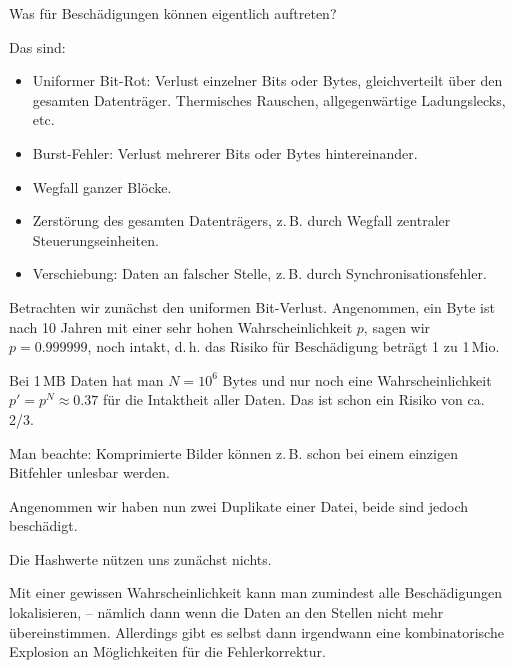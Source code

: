 \documentclass{beamer}
\begin{document}
\begin{frame}[t]
\vspace{1em}
Was für Beschädigungen können eigentlich auftreten?\pause

\vspace{1em}
Das sind:
\begin{itemize}
\item Uniformer Bit-Rot: Verlust einzelner Bits oder Bytes,
  gleichverteilt über den gesamten Datenträger. Thermisches Rauschen,
  allgegenwärtige Ladungslecks, etc.
\item Burst-Fehler: Verlust mehrerer Bits oder Bytes hintereinander.
\item Wegfall ganzer Blöcke.
\item Zerstörung des gesamten Datenträgers, z.\,B. durch Wegfall
  zentraler Steuerungseinheiten.
\item Verschiebung: Daten an falscher Stelle, z.\,B. durch
  Synchronisationsfehler.
\end{itemize}
\end{frame}

\begin{frame}[t]
\vspace{2em}
Betrachten wir zunächst den uniformen Bit-Verlust. Angenommen, ein Byte
ist nach 10 Jahren mit einer sehr hohen Wahrscheinlichkeit $p$, sagen
wir $p=0.999999$, noch intakt, d.\,h. das Risiko für Beschädigung beträgt
1 zu 1\,Mio.\pause

\vspace{1em}
Bei 1\,MB Daten hat man $N=10^6$ Bytes und nur noch eine
Wahrscheinlichkeit $p' = p^N \approx 0.37$ für die Intaktheit aller Daten.
Das ist schon ein Risiko von ca. 2/3.\pause

\vspace{1em}
Man beachte: Komprimierte Bilder können z.\,B. schon bei einem einzigen
Bitfehler unlesbar werden.
\end{frame}

\begin{frame}[t]
\vspace{2em}
Angenommen wir haben nun zwei Duplikate einer Datei,
beide sind jedoch beschädigt.\pause

\vspace{1em}
Die Hashwerte nützen uns zunächst nichts.\pause

\vspace{1em}
Mit einer gewissen Wahrscheinlichkeit kann man zumindest alle
Beschädigungen lokalisieren, -- nämlich dann wenn die Daten an den
Stellen nicht mehr übereinstimmen. Allerdings gibt es selbst dann
irgendwann eine kombinatorische Explosion an Möglichkeiten für
die Fehlerkorrektur.
\end{frame}
\end{document}
